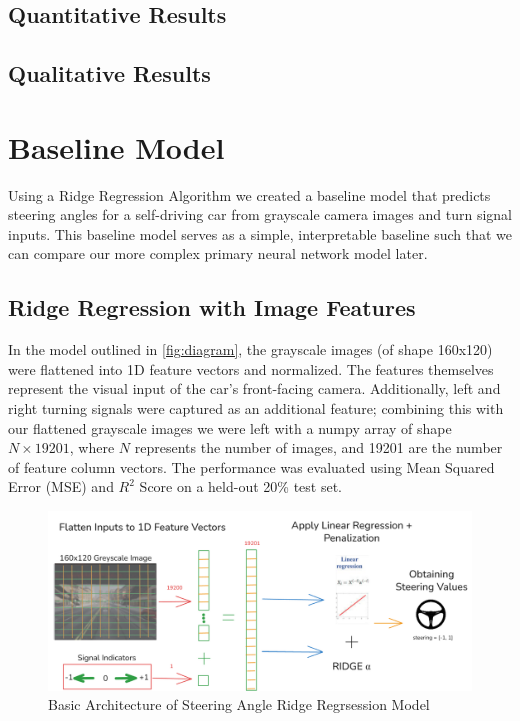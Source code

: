 \documentclass{article} %
\begin{document}
\subsection{Quantitative Results}

\subsection{Qualitative Results}

\section{Baseline Model}

Using a Ridge Regression Algorithm we created a baseline model that predicts steering angles for a self-driving car
from grayscale camera images and turn signal inputs. This baseline model serves as a simple, interpretable baseline
such that we can compare our more complex primary neural network model later. 


\subsection{Ridge Regression with Image Features}

In the model outlined in \autoref{fig:diagram}, the grayscale images (of shape 160x120) were flattened into 1D feature vectors and normalized. The features themselves
represent the visual input of the car's front-facing camera. Additionally, left and right turning signals were captured as an
additional feature; combining this with our flattened grayscale images we were left with a numpy array of shape $N \times 19201$,
where $N$ represents the number of images, and 19201 are the number of feature column vectors.  The performance was evaluated using Mean Squared 
Error (MSE) and $R^2$ Score on a held-out 20\% test set.

\begin{figure}[H] %
    \centering
    \includegraphics[width=1.0\textwidth]{diagram.png} %
    \caption{Basic Architecture of Steering Angle  Ridge Regrsession Model}
    \label{fig:diagram}
\end{figure}
\end{document}
